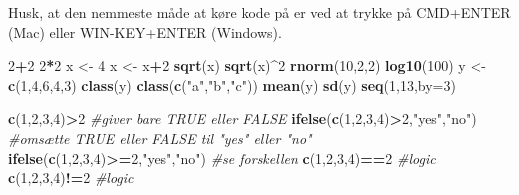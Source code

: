 \documentclass[
]{book}
\newenvironment{Shaded}{\begin{snugshade}}{\end{snugshade}}
\newcommand{\AttributeTok}[1]{\textcolor[rgb]{0.27,0.27,0.27}{#1}}
\newcommand{\CommentTok}[1]{\textcolor[rgb]{0.37,0.37,0.37}{\textit{#1}}}
\newcommand{\DecValTok}[1]{\textcolor[rgb]{0.06,0.06,0.06}{#1}}
\newcommand{\FunctionTok}[1]{\textcolor[rgb]{0.27,0.27,0.27}{\textbf{#1}}}
\newcommand{\NormalTok}[1]{#1}
\newcommand{\OtherTok}[1]{\textcolor[rgb]{0.37,0.37,0.37}{#1}}
\newcommand{\SpecialCharTok}[1]{\textcolor[rgb]{0.43,0.43,0.43}{\textbf{#1}}}
\newcommand{\StringTok}[1]{\textcolor[rgb]{0.5,0.5,0.5}{#1}}
\begin{document}
Husk, at den nemmeste måde at køre kode på er ved at trykke på CMD+ENTER (Mac) eller WIN-KEY+ENTER (Windows).

\begin{Shaded}
\begin{Highlighting}[]
\DecValTok{2}\SpecialCharTok{+}\DecValTok{2}
\DecValTok{2}\SpecialCharTok{*}\DecValTok{2}
\NormalTok{x }\OtherTok{\textless{}{-}} \DecValTok{4}
\NormalTok{x }\OtherTok{\textless{}{-}}\NormalTok{ x}\SpecialCharTok{+}\DecValTok{2}
\FunctionTok{sqrt}\NormalTok{(x)}
\FunctionTok{sqrt}\NormalTok{(x)}\SpecialCharTok{\^{}}\DecValTok{2}
\FunctionTok{rnorm}\NormalTok{(}\DecValTok{10}\NormalTok{,}\DecValTok{2}\NormalTok{,}\DecValTok{2}\NormalTok{)}
\FunctionTok{log10}\NormalTok{(}\DecValTok{100}\NormalTok{)}
\NormalTok{y }\OtherTok{\textless{}{-}}  \FunctionTok{c}\NormalTok{(}\DecValTok{1}\NormalTok{,}\DecValTok{4}\NormalTok{,}\DecValTok{6}\NormalTok{,}\DecValTok{4}\NormalTok{,}\DecValTok{3}\NormalTok{)}
\FunctionTok{class}\NormalTok{(y)}
\FunctionTok{class}\NormalTok{(}\FunctionTok{c}\NormalTok{(}\StringTok{"a"}\NormalTok{,}\StringTok{"b"}\NormalTok{,}\StringTok{"c"}\NormalTok{))}
\FunctionTok{mean}\NormalTok{(y)}
\FunctionTok{sd}\NormalTok{(y)}
\FunctionTok{seq}\NormalTok{(}\DecValTok{1}\NormalTok{,}\DecValTok{13}\NormalTok{,}\AttributeTok{by=}\DecValTok{3}\NormalTok{)}
\end{Highlighting}
\end{Shaded}

\begin{Shaded}
\begin{Highlighting}[]
\FunctionTok{c}\NormalTok{(}\DecValTok{1}\NormalTok{,}\DecValTok{2}\NormalTok{,}\DecValTok{3}\NormalTok{,}\DecValTok{4}\NormalTok{)}\SpecialCharTok{\textgreater{}}\DecValTok{2} \CommentTok{\#giver bare TRUE eller FALSE}
\FunctionTok{ifelse}\NormalTok{(}\FunctionTok{c}\NormalTok{(}\DecValTok{1}\NormalTok{,}\DecValTok{2}\NormalTok{,}\DecValTok{3}\NormalTok{,}\DecValTok{4}\NormalTok{)}\SpecialCharTok{\textgreater{}}\DecValTok{2}\NormalTok{,}\StringTok{"yes"}\NormalTok{,}\StringTok{"no"}\NormalTok{) }\CommentTok{\#omsætte TRUE eller FALSE til "yes" eller "no"}
\FunctionTok{ifelse}\NormalTok{(}\FunctionTok{c}\NormalTok{(}\DecValTok{1}\NormalTok{,}\DecValTok{2}\NormalTok{,}\DecValTok{3}\NormalTok{,}\DecValTok{4}\NormalTok{)}\SpecialCharTok{\textgreater{}=}\DecValTok{2}\NormalTok{,}\StringTok{"yes"}\NormalTok{,}\StringTok{"no"}\NormalTok{) }\CommentTok{\#se forskellen}
\FunctionTok{c}\NormalTok{(}\DecValTok{1}\NormalTok{,}\DecValTok{2}\NormalTok{,}\DecValTok{3}\NormalTok{,}\DecValTok{4}\NormalTok{)}\SpecialCharTok{==}\DecValTok{2} \CommentTok{\#logic}
\FunctionTok{c}\NormalTok{(}\DecValTok{1}\NormalTok{,}\DecValTok{2}\NormalTok{,}\DecValTok{3}\NormalTok{,}\DecValTok{4}\NormalTok{)}\SpecialCharTok{!=}\DecValTok{2} \CommentTok{\#logic}
\end{Highlighting}
\end{Shaded}
\end{document}
